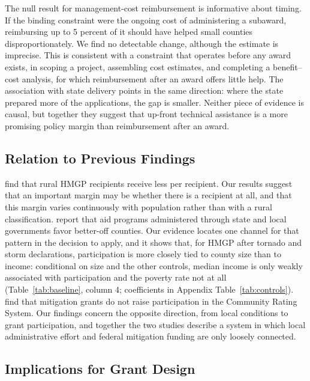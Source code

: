 The null result for management-cost reimbursement is informative about timing. If the binding constraint were the ongoing cost of administering a subaward, reimbursing up to 5 percent of it should have helped small counties disproportionately. We find no detectable change, although the estimate is imprecise. This is consistent with a constraint that operates before any award exists, in scoping a project, assembling cost estimates, and completing a benefit--cost analysis, for which reimbursement after an award offers little help. The association with state delivery points in the same direction: where the state prepared more of the applications, the gap is smaller. Neither piece of evidence is causal, but together they suggest that up-front technical assistance is a more promising policy margin than reimbursement after an award.

\subsection{Relation to Previous Findings}

\textcite{seong2022naturally} find that rural HMGP recipients receive less per recipient. Our results suggest that an important margin may be whether there is a recipient at all, and that this margin varies continuously with population rather than with a rural classification. \textcite{miao2025equity} report that aid programs administered through state and local governments favor better-off counties. Our evidence locates one channel for that pattern in the decision to apply, and it shows that, for HMGP after tornado and storm declarations, participation is more closely tied to county size than to income: conditional on size and the other controls, median income is only weakly associated with participation and the poverty rate not at all (Table~\ref{tab:baseline}, column 4; coefficients in Appendix Table~\ref{tab:controls}). \textcite{frimpong2023federal} find that mitigation grants do not raise participation in the Community Rating System. Our findings concern the opposite direction, from local conditions to grant participation, and together the two studies describe a system in which local administrative effort and federal mitigation funding are only loosely connected.

\subsection{Implications for Grant Design}

